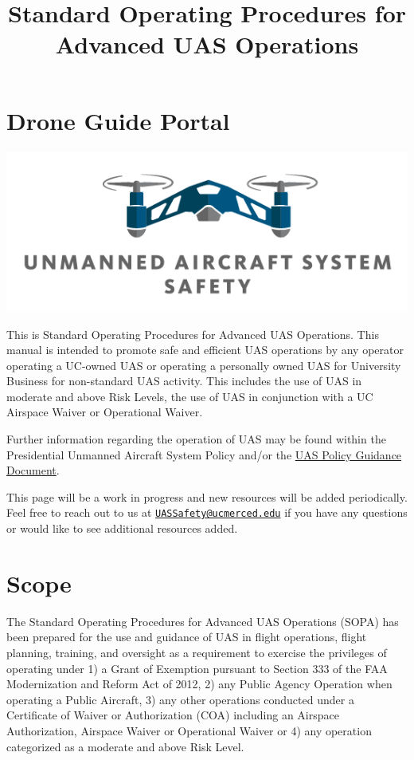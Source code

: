 \documentclass[
]{book}
\title{Standard Operating Procedures for Advanced UAS Operations}
\author{}
\date{\vspace{-2.5em}}
\begin{document}
\maketitle

{
\setcounter{tocdepth}{1}
\tableofcontents
}
\hypertarget{ch-getting-started}{%
\chapter{Drone Guide Portal}\label{ch-getting-started}}

\begin{center}\includegraphics[width=0.5\linewidth]{images/COE_logo} \end{center}

This is Standard Operating Procedures for Advanced UAS Operations. This manual is intended to promote safe and efficient UAS operations by any operator operating a UC-owned UAS or operating a personally owned UAS for University Business for non-standard UAS activity. This includes the use of UAS in moderate and above Risk Levels, the use of UAS in conjunction with a UC Airspace Waiver or Operational Waiver.

Further information regarding the operation of UAS may be found within the Presidential Unmanned Aircraft System Policy and/or the \href{https://ucdrones.github.io/Policy_Guidance/}{UAS Policy Guidance Document}.

This page will be a work in progress and new resources will be added periodically. Feel free to reach out to us at \href{mailto:UASSafety@ucmerced.edu}{\nolinkurl{UASSafety@ucmerced.edu}} if you have any questions or would like to see additional resources added.

\hypertarget{ch-scope}{%
\chapter{Scope}\label{ch-scope}}

The Standard Operating Procedures for Advanced UAS Operations (SOPA) has been prepared for the use and guidance of UAS in flight operations, flight planning, training, and oversight as a requirement to exercise the privileges of operating under 1) a Grant of Exemption pursuant to Section 333 of the FAA Modernization and Reform Act of 2012, 2) any Public Agency Operation when operating a Public Aircraft, 3) any other operations conducted under a Certificate of Waiver or Authorization (COA) including an Airspace Authorization, Airspace Waiver or Operational Waiver or 4) any operation categorized as a moderate and above Risk Level.
\end{document}

